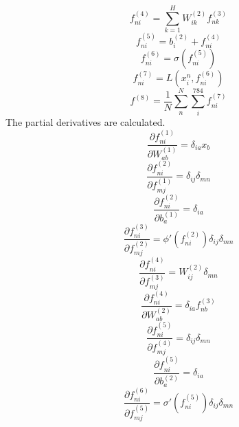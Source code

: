 \documentclass[fleqn]{report}
\begin{document}
\begin{equation}
    f^{(4)}_{ni} = \sum_{k=1}^H W^{(2)}_{ik} f^{(3)}_{nk}
\end{equation}
\begin{equation}
    f^{(5)}_{ni} = b^{(2)}_i + f^{(4)}_{ni}
\end{equation}
\begin{equation}
    f^{(6)}_{ni} = \sigma \left ( f^{(5)}_{ni} \right )
\end{equation}
\begin{equation}
    f^{(7)}_{ni} = L\left(x_i^n, f^{(6)}_{ni}\right)
\end{equation}
\begin{equation}
    f^{(8)} = \frac{1}{N} \sum_n^N \sum_i^{784} f^{(7)}_{ni}
\end{equation}
The partial derivatives are calculated.
\begin{equation}
    \frac{\partial f^{(1)}_{ni}}{\partial W^{(1)}_{ab}} = \delta_{ia} x_b
\end{equation}
\begin{equation}
    \frac{\partial f^{(2)}_{ni}}{\partial f^{(1)}_{mj}} = \delta_{ij} \delta_{mn}
\end{equation}
\begin{equation}
    \frac{\partial f^{(2)}_{ni}}{\partial b^{(1)}_{a}} = \delta_{ia}
\end{equation}
\begin{equation}
    \frac{\partial f^{(3)}_{ni}}{\partial f^{(2)}_{mj}} = \phi'(f^{(2)}_{ni}) \delta_{ij} \delta_{mn}
\end{equation}
\begin{equation}
    \frac{\partial f^{(4)}_{ni}}{\partial f^{(3)}_{mj}} = W^{(2)}_{ij} \delta_{mn}
\end{equation}
\begin{equation}
    \frac{\partial f^{(4)}_{ni}}{\partial W^{(2)}_{ab}} = \delta_{ia} f^{(3)}_{nb}
\end{equation}
\begin{equation}
    \frac{\partial f^{(5)}_{ni}}{\partial f^{(4)}_{mj}} = \delta_{ij} \delta_{mn}
\end{equation}
\begin{equation}
    \frac{\partial f^{(5)}_{ni}}{\partial b^{(2)}_{a}} = \delta_{ia}
\end{equation}
\begin{equation}
    \frac{\partial f^{(6)}_{ni}}{\partial f^{(5)}_{mj}} = \sigma'\left(f^{(5)}_{ni}\right) \delta_{ij} \delta_{mn}
\end{equation}
\end{document}
